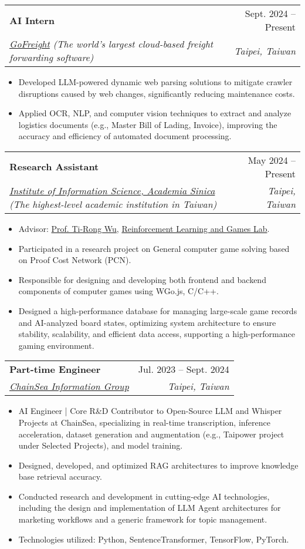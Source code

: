 \documentclass[letterpaper,10pt]{article}
\makeatletter
\newcommand{\resumeItem}[1]{
  \item\small{
    {#1 \vspace{-2pt}}
  }
}
\newcommand{\resumeSubheading}[4]{
  \vspace{-2pt}\item
    \begin{tabular*}{0.97\textwidth}[t]{l@{\extracolsep{\fill}}r}
      \textbf{#1} & #2 \\
      \textit{\small#3} & \textit{\small #4} \\
    \end{tabular*}\vspace{-7pt}
}
\newcommand{\resumeItemListStart}{\begin{itemize}}
\newcommand{\resumeItemListEnd}{\end{itemize}\vspace{-5pt}}
\makeatother
\begin{document}
    \resumeSubheading
      {AI Intern}{Sept. 2024 -- Present}
      {\href{https://www.gofreight.com/}{GoFreight} (The world's largest cloud-based freight forwarding software)}{Taipei, Taiwan}
      \resumeItemListStart
        \resumeItem{Developed LLM-powered dynamic web parsing solutions to mitigate crawler disruptions caused by web changes, significantly reducing maintenance costs.}
        \resumeItem{Applied OCR, NLP, and computer vision techniques to extract and analyze logistics documents (e.g., Master Bill of Lading, Invoice), improving the accuracy and efficiency of automated document processing.}
      \resumeItemListEnd

    \resumeSubheading
      {Research Assistant}{May 2024 -- Present}
      {\href{https://www.iis.sinica.edu.tw/en/page/AboutUs/Introduction.html}{Institute of Information Science, Academia Sinica} (The highest-level academic institution in Taiwan)}{Taipei, Taiwan}
      \resumeItemListStart
        \resumeItem{Advisor: \href{https://homepage.iis.sinica.edu.tw/pages/tirongwu/index_en.html}{Prof. Ti-Rong Wu}, \href{https://github.com/rlglab/}{Reinforcement Learning and Games Lab}.}
         \resumeItem{Participated in a research project on General computer game solving based on Proof Cost Network (PCN).}
        \resumeItem{Responsible for designing and developing both frontend and backend components of computer games using WGo.js, C/C++.}
        \resumeItem{Designed a high-performance database for managing large-scale game records and AI-analyzed board states, optimizing system architecture to ensure stability, scalability, and efficient data access, supporting a high-performance gaming environment.}
      \resumeItemListEnd

    \resumeSubheading
      {Part-time Engineer}{Jul. 2023 -- Sept. 2024}
      {\href{https://www.chainsea.com.tw/about/introduction/}{ChainSea Information Group}}{Taipei, Taiwan}
      \resumeItemListStart
        \resumeItem{AI Engineer | Core R\&D Contributor to Open-Source LLM and Whisper Projects at ChainSea, specializing in real-time transcription, inference acceleration, dataset generation and augmentation (e.g., Taipower project under Selected Projects), and model training.}
        \resumeItem{Designed, developed, and optimized RAG architectures to improve knowledge base retrieval accuracy.}
        \resumeItem{Conducted research and development in cutting-edge AI technologies, including the design and implementation of LLM Agent architectures for marketing workflows and a generic framework for topic management.}
        \resumeItem{Technologies utilized: Python, SentenceTransformer, TensorFlow, PyTorch.}
      \resumeItemListEnd
\end{document}
